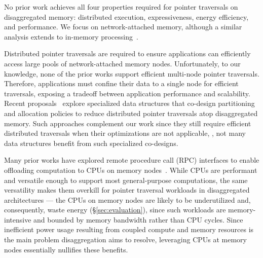 


No prior work achieves all four properties required for pointer traversals on disaggregated memory: distributed execution, expressiveness, energy efficiency, and performance. We focus on network-attached memory, although a similar analysis extends to in-memory processing~\cite{walkers, ahn2015scalable, impica, asghari2016chameleon, chi2016prime, seshadri2017simple, dai2018graphh, schuiki2018scalable, mutlu2019processing, kwon2019_TensorDIMM, boroumand2019_codna, gu2020ipim, lockerman2020livia, cho2020_data, ke2020_RecNMP, wang2021stream, xie2021spacea, ke2021near, singh2021fpga, olgun2022pidram, mutlu2022modern, oliveira2022accelerating, eckert2022eidetic, tu2022redcim, dai2022dimmining, devic2022_PIM, wang2022_Nearstream, gomez2023evaluating, xie2023mpu}.
 

 Distributed pointer traversals are required to ensure applications can efficiently access large pools of network-attached memory nodes. Unfortunately, to our knowledge, none of the prior works support efficient multi-node pointer traversals. Therefore, applications must confine their data to a single node for efficient traversals, exposing a tradeoff between application performance and scalability. Recent proposals~\cite{sherman, clover, fusee, rolex, marlin, sephash, ditto} explore specialized data structures that co-design partitioning and allocation policies to reduce distributed pointer traversals atop disaggregated memory. Such approaches complement our work since they still require efficient distributed traversals when their optimizations are not applicable, \eg, not many data structures benefit from such specialized co-designs. 

 Many prior works have explored remote procedure call (RPC) interfaces to enable offloading computation to CPUs on memory nodes~\cite{aifm, kayak_nsdi_21, splinter, storagefunctions, storm_systor_19}. While CPUs are performant and versatile enough to support most general-purpose computations, the same versatility makes them overkill for pointer traversal workloads in disaggregated architectures --- the CPUs on memory nodes are likely to be underutilized and, consequently, waste energy (\S\ref{sec:evaluation}), since such workloads are memory-intensive and bounded by memory bandwidth rather than CPU cycles. 
Since inefficient power usage resulting from coupled compute and memory resources is the main problem disaggregation aims to resolve, leveraging CPUs at memory nodes essentially nullifies these benefits. 

